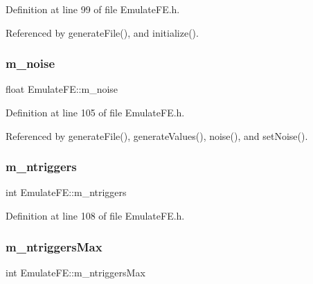 Definition at line 99 of file Emulate\+F\+E.\+h.



Referenced by generate\+File(), and initialize().

\mbox{\label{classEmulateFE_a74f8720a1da5806fad3811339ef9b98f}} 
\subsubsection{\texorpdfstring{m\+\_\+noise}{m\_noise}}
{\footnotesize\ttfamily float Emulate\+F\+E\+::m\+\_\+noise\hspace{0.3cm}{\ttfamily [private]}}



Definition at line 105 of file Emulate\+F\+E.\+h.



Referenced by generate\+File(), generate\+Values(), noise(), and set\+Noise().

\mbox{\label{classEmulateFE_a8df57e3d66bde60e9a79cb2ae54a9f4a}} 
\subsubsection{\texorpdfstring{m\+\_\+ntriggers}{m\_ntriggers}}
{\footnotesize\ttfamily int Emulate\+F\+E\+::m\+\_\+ntriggers\hspace{0.3cm}{\ttfamily [private]}}



Definition at line 108 of file Emulate\+F\+E.\+h.

\mbox{\label{classEmulateFE_a2d473d12faf30f4870458874d70c7f55}} 
\subsubsection{\texorpdfstring{m\+\_\+ntriggers\+Max}{m\_ntriggersMax}}
{\footnotesize\ttfamily int Emulate\+F\+E\+::m\+\_\+ntriggers\+Max\hspace{0.3cm}{\ttfamily [private]}}



